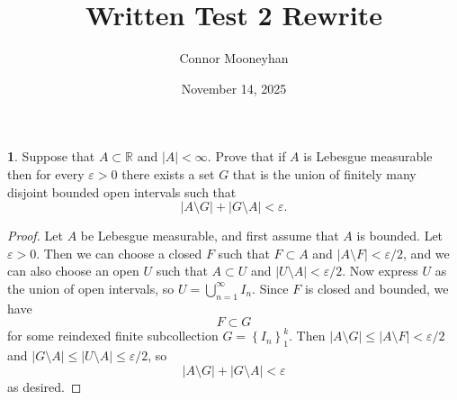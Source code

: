 \documentclass[12pt]{article}
\title{Written Test 2 Rewrite}
\author{Connor Mooneyhan}
\date{November 14, 2025}
\theoremstyle{definition}
\newtheorem{ex}{}
\newenvironment{exercise}[1]{
	\renewcommand{\theex}{#1}
	\begin{ex}
		}{\end{ex}}
\begin{document}
\maketitle

\begin{exercise}{1(a)}
	Suppose that $A \subset \mathbb{R}$ and $|A| < \infty$.
	Prove that if $A$ is Lebesgue measurable then for every $\varepsilon > 0$ there exists a set $G$ that is the union of finitely many disjoint bounded open intervals such that \begin{equation*}
		|A \setminus G| + |G \setminus A| < \varepsilon.
	\end{equation*}
\end{exercise}
\begin{proof}
	Let $A$ be Lebesgue measurable, and first assume that $A$ is bounded.
	Let $\varepsilon > 0$.
	Then we can choose a closed $F$ such that $F \subset A$ and $|A \setminus F| < \varepsilon/2$, and we can also choose an open $U$ such that $A \subset U$ and $|U \setminus A| < \varepsilon/2$.
	Now express $U$ as the union of open intervals, so $U = \bigcup_{n=1}^\infty I_n$.
	Since $F$ is closed and bounded, we have \begin{equation*}
		F \subset G
	\end{equation*}
	for some reindexed finite subcollection $G = \left\lbrace I_n \right\rbrace_{1}^k$.
	Then $|A \setminus G| \leq |A \setminus F| < \varepsilon/2$ and $|G \setminus A| \leq |U \setminus A| \leq \varepsilon/2$, so \begin{equation*}
		|A \setminus G| + |G \setminus A| < \varepsilon
	\end{equation*}
	as desired.


\end{proof}
\end{document}
